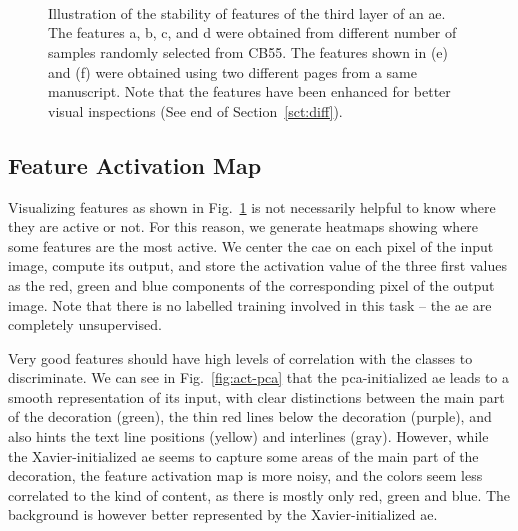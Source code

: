 \documentclass[conference]{IEEEtran}
\begin{document}
\begin{figure}[tb]
  \centering
  \hfill
  \\
  \hfill
  \\
  \hfill
   \\
  \caption{
    Illustration of the stability of features of the third layer of an \ac{ae}.
    The features a, b, c, and d were obtained from different number of samples randomly selected from CB55.
    The features shown in (e) and (f) were obtained using two different pages from a same manuscript.
		Note that the features have been enhanced for better visual inspections (See end of Section~\ref{sct:diff}).
  }
  \label{fig:pca-stability}
\end{figure}


\subsection{Feature Activation Map}
Visualizing features as shown in Fig.~\ref{fig:pca-stability} is not necessarily helpful to know where they are active or not.
For this reason, we generate heatmaps showing where some features are the most active.
We center the \ac{cae} on each pixel of the input image, compute its output, and store the activation value of the three first values as the red, green and blue components of the corresponding pixel of the output image.
Note that there is no labelled training involved in this task -- the \ac{ae} are completely unsupervised.

Very good features should have high levels of correlation with the classes to discriminate.
We can see in Fig.~\ref{fig:act-pca} that the \ac{pca}-initialized \ac{ae} leads to a smooth representation of its input, with clear distinctions between the main part of the decoration (green), the thin red lines below the decoration (purple), and also hints the text line positions (yellow) and interlines (gray).
However, while the Xavier-initialized \ac{ae} seems to capture some areas of the main part of the decoration, the feature activation map is more noisy, and the colors seem less correlated to the kind of content, as there is mostly only red, green and blue.
The background is however better represented by the Xavier-initialized \ac{ae}.
\end{document}
